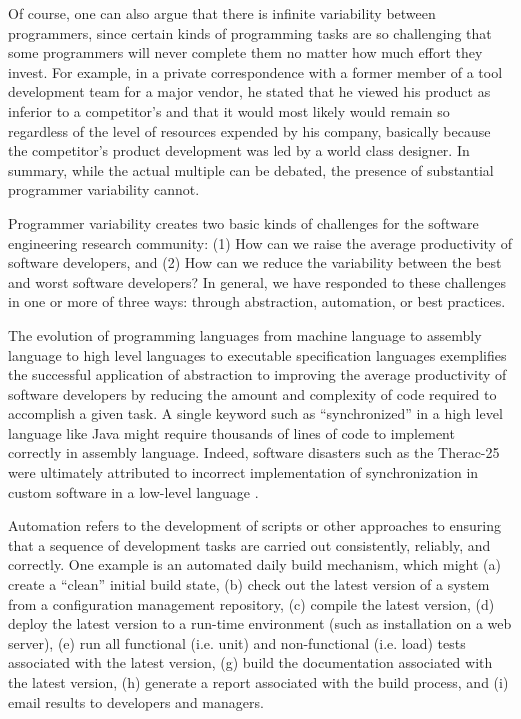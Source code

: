 Of course, one can also argue that there is infinite variability between
programmers, since certain kinds of programming tasks are so challenging
that some programmers will never complete them no matter how much effort
they invest. For example, in a private correspondence with a former member
of a tool development team for a major vendor, he stated that he viewed his
product as inferior to a competitor's and that it would most likely would
remain so regardless of the level of resources expended by his company,
basically because the competitor's product development was led by a world
class designer.  In summary, while the actual multiple can be debated, the
presence of substantial programmer variability cannot.


Programmer variability creates two basic kinds of challenges for the
software engineering research community: (1) How can we raise the average
productivity of software developers, and (2) How can we reduce the
variability between the best and worst software developers?  In general, we
have responded to these challenges in one or more of three ways: through
abstraction, automation, or best practices.

The evolution of programming languages from machine language to assembly
language to high level languages to executable specification languages
exemplifies the successful application of abstraction to improving the
average productivity of software developers by reducing the amount and
complexity of code required to accomplish a given task.  A single keyword
such as ``synchronized'' in a high level language like Java might require
thousands of lines of code to implement correctly in assembly language.
Indeed, software disasters such as the Therac-25 were ultimately
attributed to incorrect implementation of synchronization in custom
software in a low-level language \cite{Leveson93}.

Automation refers to the development of scripts or other approaches to
ensuring that a sequence of development tasks are carried out consistently,
reliably, and correctly.  One example is an automated daily build
mechanism, which might (a) create a ``clean'' initial build state, (b)
check out the latest version of a system from a configuration management
repository, (c) compile the latest version, (d) deploy the latest version
to a run-time environment (such as installation on a web server), (e) run
all functional (i.e. unit) and non-functional (i.e. load) tests associated
with the latest version, (g) build the documentation associated with the
latest version, (h) generate a report associated with the build process,
and (i) email results to developers and managers.  

